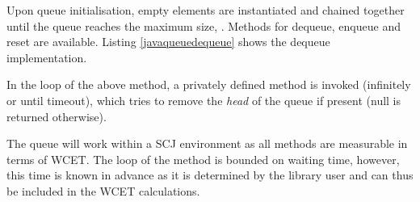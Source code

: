 

Upon queue initialisation, empty elements are instantiated and chained together until the queue reaches the maximum size, . Methods for dequeue, enqueue and reset are available. Listing \ref{javaqueuedequeue} shows the dequeue implementation.



In the loop of the above method, a privately defined  method is invoked (infinitely or until timeout), which tries to remove the \textit{head} of the queue if present (null is returned otherwise).

The queue will work within a SCJ environment as all methods are measurable in terms of WCET. The loop of the  method is bounded on waiting time, however, this time is known in advance as it is determined by the library user and can thus be included in the WCET calculations.